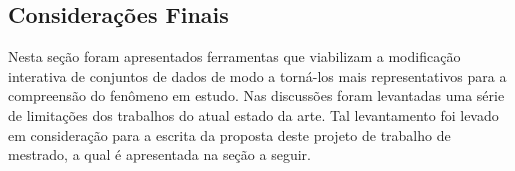 \subsection{Considerações Finais}

Nesta seção foram apresentados ferramentas que viabilizam a
modificação interativa de conjuntos de dados de modo a
torná-los mais representativos para a compreensão do
fenômeno em estudo.  Nas discussões foram levantadas uma
série de limitações dos trabalhos do atual estado da arte.
Tal levantamento foi levado em consideração para a escrita
da proposta deste projeto de trabalho de mestrado, a qual é
apresentada na seção a seguir.
